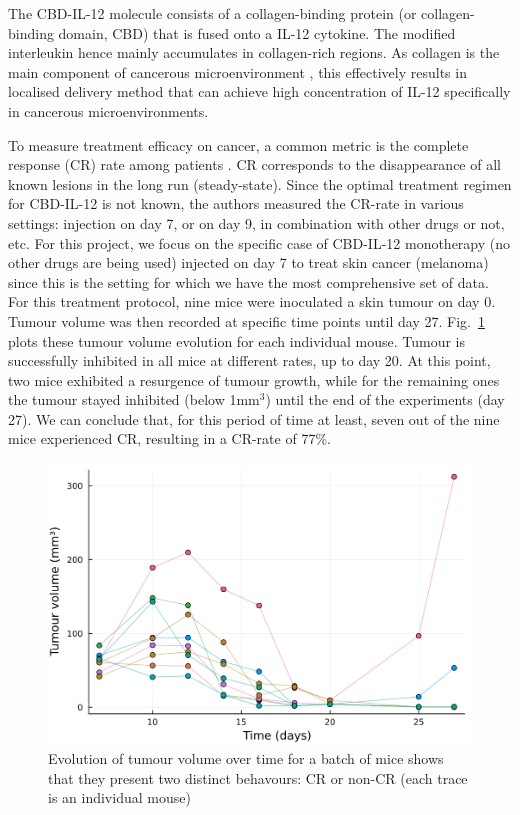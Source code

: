 \documentclass[11pt]{article}
\begin{document}
The CBD-IL-12  molecule consists of a collagen-binding protein (or collagen-binding domain, CBD) that is fused onto a IL-12 cytokine. The modified interleukin hence mainly accumulates in collagen-rich regions. As collagen is the main component of cancerous microenvironment \cite{collagenInCancer}, this effectively results in localised delivery method that can achieve high concentration of IL-12 specifically in cancerous microenvironments.

To measure treatment efficacy on cancer, a common metric is the complete response (CR) rate among patients \cite{cancMetric}. CR corresponds to the disappearance of all known lesions \cite{CRDef} in the long run (steady-state). Since the optimal treatment regimen for CBD-IL-12 is not known, the authors measured the CR-rate in various settings: injection on day 7, or on day 9, in combination with other drugs or not, etc. For this project, we focus on the specific case of CBD-IL-12 monotherapy (no other drugs are being used) injected on day 7 to treat skin cancer (melanoma) since this is the setting for which we have the most comprehensive set of data. For this treatment protocol, nine mice were inoculated a skin tumour on day 0. Tumour volume was then recorded at specific time points until day 27. Fig.~\ref{fig:outcomedual} plots these tumour volume evolution for each individual mouse. Tumour is successfully inhibited in all mice at different rates, up to day 20. At this point, two mice exhibited a resurgence of tumour growth, while for the remaining ones the tumour stayed inhibited (below 1mm$^3$) until the end of the experiments (day 27). We can conclude that, for this period of time at least, seven out of the nine mice experienced CR, resulting in a CR-rate of 77\%. 

\begin{figure}[!ht]
    \centering\includegraphics[scale=0.3]{crnoncr3.png}
    \caption{Evolution of tumour volume over time for a batch of mice shows that they present two distinct behavours: CR or non-CR (each trace is an individual mouse)}
    \label{fig:outcomedual}
\end{figure}
\end{document}
